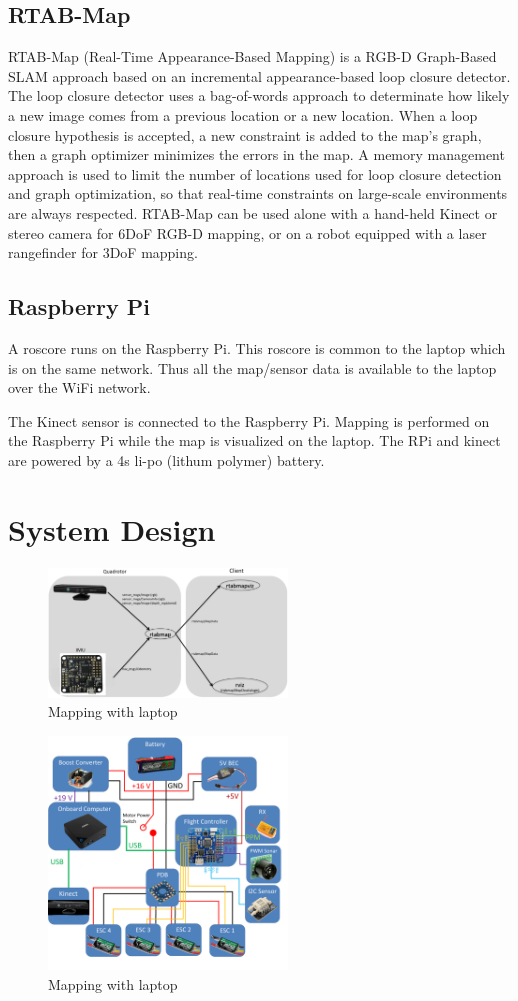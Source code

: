\documentclass[journal]{IEEEtran}
\begin{document}
\subsection{RTAB-Map}
RTAB-Map (Real-Time Appearance-Based Mapping) is a RGB-D Graph-Based SLAM approach based on an incremental appearance-based loop closure detector. The loop closure detector uses a bag-of-words approach to determinate how likely a new image comes from a previous location or a new location. When a loop closure hypothesis is accepted, a new constraint is added to the map’s graph, then a graph optimizer minimizes the errors in the map. A memory management approach is used to limit the number of locations used for loop closure detection and graph optimization, so that real-time constraints on large-scale environments are always respected. RTAB-Map can be used alone with a hand-held Kinect or stereo camera for 6DoF RGB-D mapping, or on a robot equipped with a laser rangefinder for 3DoF mapping.

\subsection{Raspberry Pi}
A roscore runs on the Raspberry Pi. This roscore is common to the laptop which is on the same network. Thus all the map/sensor data is available to the laptop over the WiFi network.

The Kinect sensor is connected to the Raspberry Pi. Mapping is performed on the Raspberry Pi while the map is visualized on the laptop. 
The RPi and kinect are powered by a 4s li-po (lithum polymer) battery. 

\section{System Design}
\begin{figure}[ht]
	\centering
	\includegraphics[width=2.5in]{setupC.png}
	\caption{Mapping with laptop}
	\label{fig_sim}
\end{figure}

\begin{figure}[ht]
	\centering
	\includegraphics[width=2.5in]{Wiring_Diagram.png}
	\caption{Mapping with laptop}
	\label{fig_sim}
\end{figure}
\end{document}
